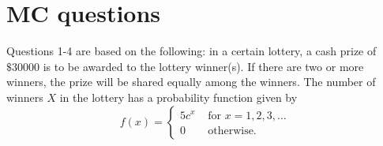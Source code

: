 \documentclass[letterpaper,10pt,addpoints]{exam}
\begin{document}


\newpage

\section{MC questions}
Questions 1-4 are based on the following: in a certain lottery, a cash prize of $\$ 30000$ is to be awarded to the lottery winner(s). If there are two or more winners, the prize will be shared equally among the winners. The number of winners $X$ in the lottery has a probability function given by
$$
f(x)=\left\{\begin{array}{cl}
5 c^x & \text { for } x=1,2,3, \dots \\
0 & \text { otherwise. }
\end{array}\right.
$$
\end{document}
